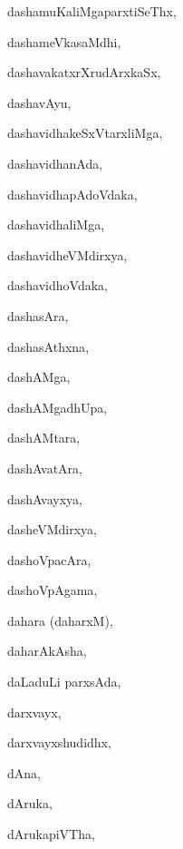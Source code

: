 \begin{multicols}{3}
{\noindent
{dashamuKaliMgaparxtiSeThx}, \pageref{dashamuKaliMgaparxtiSeThx}

\noindent
{dashameVkasaMdhi}, \pageref{dashameVkasaMdhi}

\noindent
{dashavakatxrXrudArxkaSx}, \pageref{dashavakatxrXrudArxkaSx}

\noindent
{dashavAyu}, \pageref{dashavAyu}

\noindent
{dashavidhakeSxVtarxliMga}, \pageref{dashavidhakeSxVtarxliMga}

\noindent
{dashavidhanAda}, \pageref{dashavidhanAda}

\noindent
{dashavidhapAdoVdaka}, \pageref{dashavidhapAdoVdaka}

\noindent
{dashavidhaliMga}, \pageref{dashavidhaliMga}

\noindent
{dashavidheVMdirxya}, \pageref{dashavidheVMdirxya}

\noindent
{dashavidhoVdaka}, \pageref{dashavidhoVdaka}

\noindent
{dashasAra}, \pageref{dashasAra}

\noindent
{dashasAthxna}, \pageref{dashasAthxna}

\noindent
{dashAMga}, \pageref{dashAMga}

\noindent
{dashAMgadhUpa}, \pageref{dashAMgadhUpa}

\noindent
{dashAMtara}, \pageref{dashAMtara}

\noindent
{dashAvatAra}, \pageref{dashAvatAra}

\noindent
{dashAvayxya}, \pageref{dashAvayxya}

\noindent
{dasheVMdirxya}, \pageref{dasheVMdirxya}

\noindent
{dashoVpacAra}, \pageref{dashoVpacAra}

\noindent
{dashoVpAgama}, \pageref{dashoVpAgama}

\noindent
{dahara (daharxM)}, \pageref{dahara daharxM}

\noindent
{daharAkAsha}, \pageref{daharAkAsha}

\noindent
{daLaduLi parxsAda}, \pageref{daLaduLi parxsAda}

\noindent
{darxvayx}, \pageref{darxvayx}

\noindent
{darxvayxshudidhx}, \pageref{darxvayxshudidhx}

\noindent
{dAna}, \pageref{dAna}

\noindent
{dAruka}, \pageref{dAruka}

\noindent
{dArukapiVTha}, \pageref{dArukapiVTha}

}
\end{multicols}
